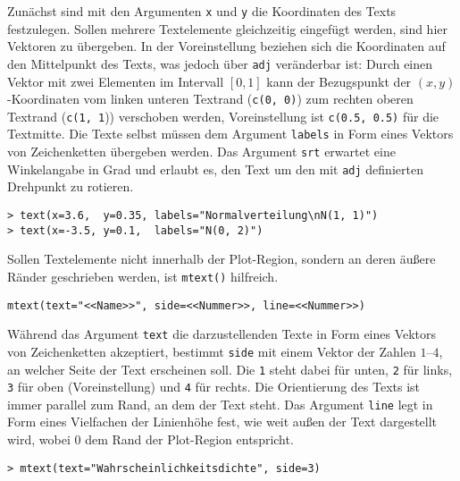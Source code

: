 Zunächst sind mit den Argumenten \lstinline!x! und \lstinline!y! die Koordinaten des Texts festzulegen. Sollen mehrere Textelemente gleichzeitig eingefügt werden, sind hier Vektoren zu übergeben. In der Voreinstellung beziehen sich die Koordinaten auf den Mittelpunkt des Texts, was jedoch über \lstinline!adj! veränderbar ist: Durch einen Vektor mit zwei Elementen im Intervall $[0, 1]$ kann der Bezugspunkt der $(x, y)$-Koordinaten vom linken unteren Textrand (\lstinline!c(0, 0)!) zum rechten oberen Textrand (\lstinline!c(1, 1!)) verschoben werden, Voreinstellung ist \lstinline!c(0.5, 0.5)! für die Textmitte. Die Texte selbst müssen dem Argument \lstinline!labels! in Form eines Vektors von Zeichenketten übergeben werden. Das Argument \lstinline!srt! erwartet eine Winkelangabe in Grad und erlaubt es, den Text um den mit \lstinline!adj! definierten Drehpunkt zu rotieren.
\begin{lstlisting}
> text(x=3.6,  y=0.35, labels="Normalverteilung\nN(1, 1)")
> text(x=-3.5, y=0.1,  labels="N(0, 2)")
\end{lstlisting}

Sollen Textelemente nicht innerhalb der Plot-Region, sondern an deren äußere Ränder geschrieben werden, ist \lstinline!mtext()! hilfreich.
\begin{lstlisting}
mtext(text="<<Name>>", side=<<Nummer>>, line=<<Nummer>>)
\end{lstlisting}

Während das Argument \lstinline!text! die darzustellenden Texte in Form eines Vektors von Zeichenketten akzeptiert, bestimmt \lstinline!side! mit einem Vektor der Zahlen $1$--$4$, an welcher Seite der Text erscheinen soll. Die \lstinline!1! steht dabei für unten, \lstinline!2! für links, \lstinline!3! für oben (Voreinstellung) und \lstinline!4! für rechts. Die Orientierung des Texts ist immer parallel zum Rand, an dem der Text steht. Das Argument \lstinline!line! legt in Form eines Vielfachen der Linienhöhe fest, wie weit außen der Text dargestellt wird, wobei $0$ dem Rand der Plot-Region entspricht.
\begin{lstlisting}
> mtext(text="Wahrscheinlichkeitsdichte", side=3)
\end{lstlisting}

